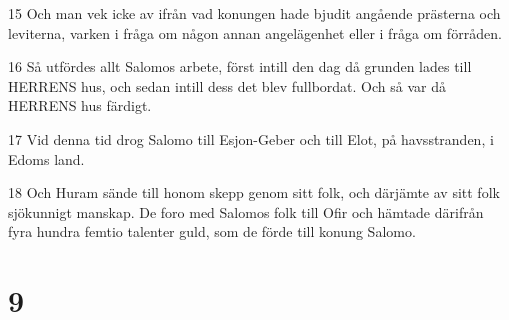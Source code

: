 \par 15 Och man vek icke av ifrån vad konungen hade bjudit angående prästerna och leviterna, varken i fråga om någon annan angelägenhet eller i fråga om förråden.
\par 16 Så utfördes allt Salomos arbete, först intill den dag då grunden lades till HERRENS hus, och sedan intill dess det blev fullbordat. Och så var då HERRENS hus färdigt.
\par 17 Vid denna tid drog Salomo till Esjon-Geber och till Elot, på havsstranden, i Edoms land.
\par 18 Och Huram sände till honom skepp genom sitt folk, och därjämte av sitt folk sjökunnigt manskap. De foro med Salomos folk till Ofir och hämtade därifrån fyra hundra femtio talenter guld, som de förde till konung Salomo.

\chapter{9}

